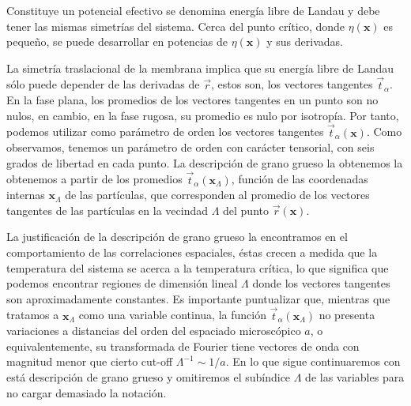 Constituye un potencial efectivo se denomina energía libre de Landau y debe tener las mismas
simetrías del sistema. Cerca del punto crítico, donde $\eta(\mathbf{x})$ es
pequeño, se puede desarrollar en potencias de $\eta(\mathbf{x})$ y sus derivadas. 

La simetría traslacional de la membrana implica que su energía libre de Landau
sólo puede depender de las derivadas de $\vec{r}$, estos son, los vectores
tangentes $\vec{t}_{\alpha}$. En la fase
plana, los promedios de los vectores tangentes en un punto son no nulos, en
cambio, en la fase rugosa, su promedio es nulo por isotropía. Por tanto,
podemos utilizar como  parámetro de orden los vectores tangentes
$\vec{t}_{\alpha}(\mathbf{x})$. Como observamos, tenemos un parámetro de orden con
carácter tensorial, con seis grados de libertad en cada punto. La descripción
de grano grueso la obtenemos la obtenemos a partir de los promedios
$\vec{t}_{\alpha}(\mathbf{x}_{\Lambda})$, función de las coordenadas internas
$\mathbf{x}_{\Lambda}$ de las partículas, que corresponden al promedio de los
vectores tangentes de las partículas en la vecindad $\Lambda$ del punto
$\vec{r}(\mathbf{x})$.
 

La justificación de la descripción de grano grueso la encontramos en el
comportamiento de las correlaciones espaciales, éstas crecen a medida que la
temperatura del sistema se acerca a la temperatura crítica, lo que significa
que podemos encontrar regiones de dimensión lineal $\Lambda$ donde los vectores tangentes son
aproximadamente constantes. Es importante puntualizar que,
mientras que tratamos a $\mathbf{x}_{\Lambda}$ como una variable continua, la función
$\vec{t}_{\alpha}(\mathbf{x}_{\Lambda})$ no presenta variaciones a distancias
del orden del espaciado microscópico $a$, o equivalentemente, su transformada
de Fourier tiene vectores de onda con magnitud menor que cierto cut-off
$\Lambda^{-1} \sim 1/a$. En lo que sigue continuaremos con está descripción de
grano grueso y omitiremos el subíndice $\Lambda$ de las variables para no
cargar demasiado la notación.

